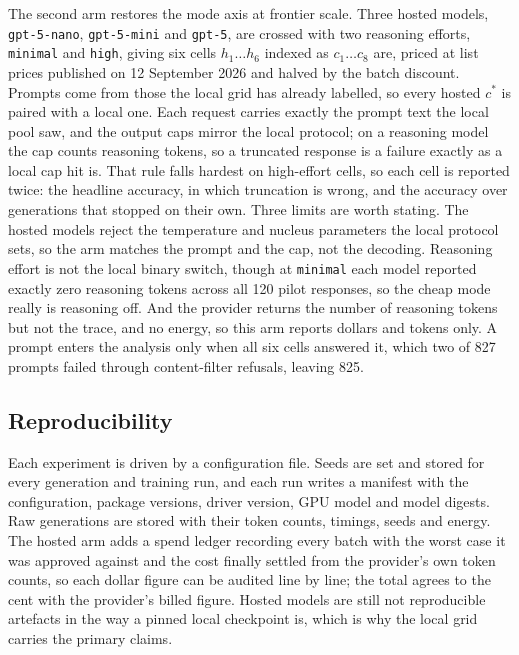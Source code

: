 \documentclass[final,5p,times,twocolumn]{elsarticle}
\theoremstyle{plain}
\newcommand{\cstar}{c^{*}}
\begin{document}
The second arm restores the mode axis at frontier scale. Three hosted models,
\texttt{gpt-5-nano}, \texttt{gpt-5-mini} and \texttt{gpt-5}, are crossed with
two reasoning efforts, \texttt{minimal} and \texttt{high}, giving six cells
$h_1 \dots h_6$ indexed as $c_1 \dots c_8$ are, priced at list prices
published on 12 September 2026 and halved by the batch discount. Prompts come
from those the local grid has already labelled, so every hosted $\cstar$ is
paired with a local one. Each request carries exactly the prompt text the
local pool saw, and the output caps mirror the local protocol; on a reasoning
model the cap counts reasoning tokens, so a truncated response is a failure
exactly as a local cap hit is. That rule falls hardest on high-effort cells,
so each cell is reported twice: the headline accuracy, in which truncation is
wrong, and the accuracy over generations that stopped on their own. Three
limits are worth stating. The hosted models reject the temperature and
nucleus parameters the local protocol sets, so the arm matches the prompt and
the cap, not the decoding. Reasoning effort is not the local binary switch,
though at \texttt{minimal} each model reported exactly zero reasoning tokens
across all 120 pilot responses, so the cheap mode really is reasoning off.
And the provider returns the number of reasoning tokens but not the trace,
and no energy, so this arm reports dollars and tokens only. A prompt enters
the analysis only when all six cells answered it, which two of 827 prompts
failed through content-filter refusals, leaving 825.

\subsection{Reproducibility}
\label{sec:setup-repro}

Each experiment is driven by a configuration file. Seeds are set and stored
for every generation and training run, and each run writes a manifest with
the configuration, package versions, driver version, GPU model and model
digests.
Raw generations are stored with their token counts, timings, seeds and
energy. The hosted arm adds a spend ledger recording every batch with the
worst case it was approved against and the cost finally settled from the
provider's own token counts, so each dollar figure can be audited line by
line; the total agrees to the cent with the provider's billed figure. Hosted
models are still not reproducible artefacts in the way a pinned local
checkpoint is, which is why the local grid carries the primary claims.
\end{document}

